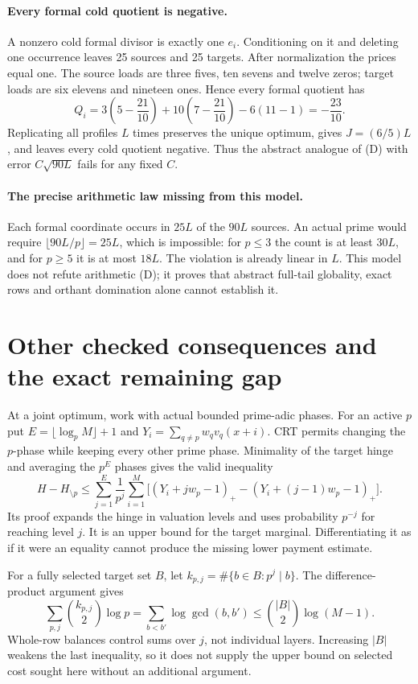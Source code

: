 \documentclass[11pt]{article}
\begin{document}
\paragraph{Every formal cold quotient is negative.}
A nonzero cold formal divisor is exactly one $e_i$. Conditioning on it
and deleting one occurrence leaves 25 sources and 25 targets. After
normalization the prices equal one. The source loads are three fives,
ten sevens and twelve zeros; target loads are six elevens and nineteen
ones. Hence every formal quotient has
\[
 Q_i=3\left(5-\frac{21}{10}\right)+10\left(7-\frac{21}{10}\right)
                    -6(11-1)=-\frac{23}{10}.\tag{7}
\]
Replicating all profiles $L$ times preserves the unique optimum, gives
$J=(6/5)L$, and leaves every cold quotient negative. Thus the abstract
analogue of (D) with error $C\sqrt{90L}$ fails for any fixed $C$.

\paragraph{The precise arithmetic law missing from this model.}
Each formal coordinate occurs in $25L$ of the $90L$ sources. An actual
prime would require $\lfloor90L/p\rfloor=25L$, which is impossible:
for $p\le3$ the count is at least $30L$, and for $p\ge5$ it is at most
$18L$. The violation is already linear in $L$. This model does not
refute arithmetic (D); it proves that abstract full-tail globality,
exact rows and orthant domination alone cannot establish it.

\section{Other checked consequences and the exact remaining gap}
At a joint optimum, work with actual bounded prime-adic phases. For an
active $p$ put $E=\lfloor\log_p M\rfloor+1$ and
$Y_i=\sum_{q\ne p}w_qv_q(x+i)$. CRT permits changing the $p$-phase while
keeping every other prime phase. Minimality of the target hinge and
averaging the $p^E$ phases gives the valid inequality
\[
 H-H_{\setminus p}\le\sum_{j=1}^{E}\frac1{p^j}\sum_{i=1}^{M}
 \big[(Y_i+jw_p-1)_+-(Y_i+(j-1)w_p-1)_+\big].\tag{8}
\]
Its proof expands the hinge in valuation levels and uses probability
$p^{-j}$ for reaching level $j$. It is an upper bound for the target
marginal. Differentiating it as if it were an equality cannot produce
the missing lower payment estimate.

For a fully selected target set $B$, let
$k_{p,j}=\#\{b\in B:p^j\mid b\}$. The difference-product argument gives
\[
 \sum_{p,j}\binom{k_{p,j}}2\log p
 =\sum_{b<b'}\log\gcd(b,b')
 \le\binom{|B|}{2}\log(M-1).
\]
Whole-row balances control sums over $j$, not individual layers.
Increasing $|B|$ weakens the last inequality, so it does not supply the
upper bound on selected cost sought here without an additional argument.
\end{document}
